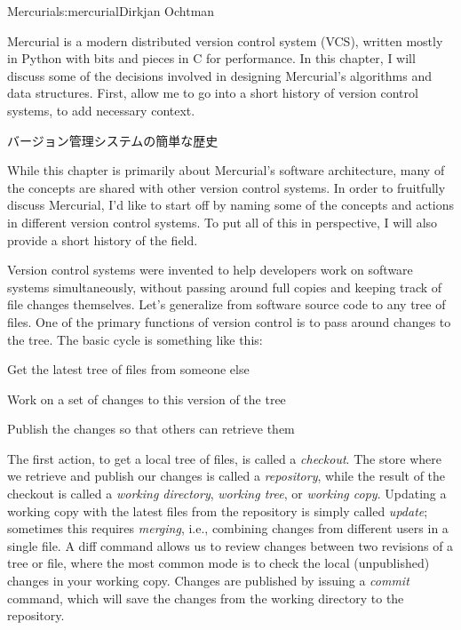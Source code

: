 \begin{aosachapter}{Mercurial}{s:mercurial}{Dirkjan Ochtman}

Mercurial is a modern distributed version control system (VCS), written
mostly in Python with bits and pieces in C for performance. In this
chapter, I will discuss some of the decisions involved in designing
Mercurial's algorithms and data structures. First, allow me to go into
a short history of version control systems, to add necessary context.

\begin{aosasect1}{バージョン管理システムの簡単な歴史}

While this chapter is primarily about Mercurial's software
architecture, many of the concepts are shared with other version
control systems. In order to fruitfully discuss Mercurial, I'd like to
start off by naming some of the concepts and actions in different
version control systems. To put all of this in perspective, I will
also provide a short history of the field.

Version control systems were invented to help developers work on
software systems simultaneously, without passing around full copies
and keeping track of file changes themselves. Let's generalize from
software source code to any tree of files. One of the primary
functions of version control is to pass around changes to the
tree. The basic cycle is something like this:

\begin{aosaenumerate}

  \item Get the latest tree of files from someone else

  \item Work on a set of changes to this version of the tree

  \item Publish the changes so that others can retrieve them

\end{aosaenumerate}

\noindent
The first action, to get a local tree of files, is called a
\emph{checkout}. The store where we retrieve and publish our changes
is called a \emph{repository}, while the result of the checkout is
called a \emph{working directory}, \emph{working tree}, or
\emph{working copy}. Updating a working copy with the latest files
from the repository is simply called \emph{update}; sometimes this
requires \emph{merging}, i.e., combining changes from different users
in a single file. A diff command allows us to review changes between
two revisions of a tree or file, where the most common mode is to
check the local (unpublished) changes in your working copy. Changes
are published by issuing a \emph{commit} command, which will save the
changes from the working directory to the repository.


\end{aosasect1}
\end{aosachapter}
